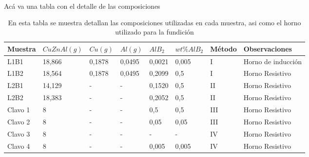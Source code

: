 \documentclass[a4paper,12pt,fleqn,twoside,openany]{book}
\begin{document}
Acá va una tabla con el detalle de las composiciones




\begin{table} %
\begin{center}
\begin{tabular}{@{}llllllll@{}}  \toprule
Muestra & $CuZnAl (g)$ & $Cu (g)$ & $Al (g)$ & $AlB_2$ & $wt \% AlB_2$ & Método & Observaciones \\ \midrule
L1B1 & 18,866  & 0,1878 & 0,0495 & 0,0021 & 0,005 & I & Horno de inducción\\
L1B2 & 18,564  & 0,1878 & 0,0495 & 0,2099 & 0,5 & I &Horno Resistivo\\
L2B1 & 14,129  & - & -  & 0,1520 & 0,5 & II &Horno Resistivo \\
L2B2 & 18,383 & - & -  & 0,2052 & 0,5 &II & Horno Resistivo \\
Clavo 1 & 8 & - & - & 0,5 & 0,5 & III & Horno Resistivo \\
Clavo 2 & 8 & - & - & 0,05 & 0,05 &III & Horno Resistivo \\
Clavo 3 & 8 & - & - & - & - &  IV & Horno Resistivo \\
Clavo 4 & 8 & - & - & 0,005 & 0,005 &IV & Horno Resistivo \\
\bottomrule
\end{tabular}
\caption{En esta tabla se muestra detallan las composiciones utilizadas en cada muestra, asi como el horno utilizado para la fundición}

\end{center}
\end{table}

\end{document}
